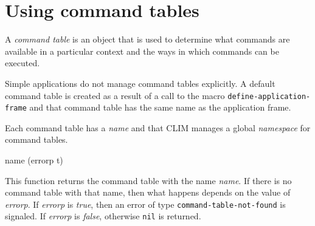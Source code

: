\chapter{Using command tables}

A \emph{command table} is an object that is used to determine what
commands are available in a particular context and the ways in which
commands can be executed.

Simple applications do not manage command tables explicitly.  A
default command table is created as a result of a call to the macro
\texttt{define-application-frame} and that command table has the same
name as the application frame.

Each command table has a \emph{name} and that CLIM manages a global
\emph{namespace} for command tables.

 {name \key (errorp t)}

This function returns the command table with the name \textit{name}.
If there is no command table with that name, then what happens depends
on the value of \textit{errorp}.  If \textit{errorp} is \emph{true},
then an error of type \texttt{command-table-not-found} is signaled. 
If \textit{errorp} is \emph{false}, otherwise \texttt{nil} is
returned.
